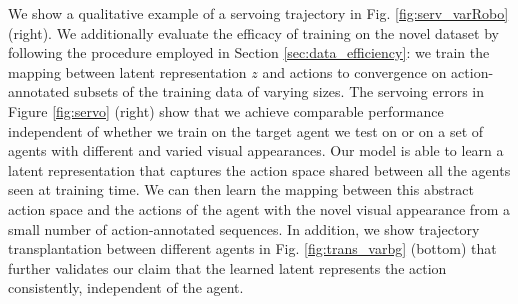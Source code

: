 \documentclass{article} %
\begin{document}
We show a qualitative example of a servoing trajectory in Fig. \ref{fig:serv_varRobo} (right). We additionally evaluate the efficacy of training on the novel dataset by following the procedure employed in Section \ref{sec:data_efficiency}: we train the mapping between latent representation $z$ and actions to convergence on action-annotated subsets of the training data of varying sizes. The servoing errors in Figure \ref{fig:servo} (right) show that we achieve comparable performance independent of whether we train on the target agent we test on or on a set of agents with different and varied visual appearances. Our model is able to learn a latent representation that captures the action space shared between all the agents seen at training time. We can then learn the mapping between this abstract action space and the actions of the agent with the novel visual appearance from a small number of action-annotated sequences. In addition, we show trajectory transplantation between different agents in Fig. \ref{fig:trans_varbg} (bottom) that further validates our claim that the learned latent represents the action consistently, independent of the agent. 
\end{document}
